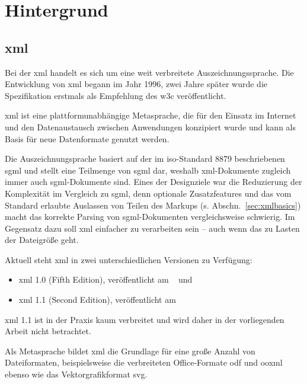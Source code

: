 \chapter{Hintergrund}
\label{chap:background}

\section{\acrfull{xml}}
\label{sec:xml}

Bei der \acrfull{xml} handelt es sich um eine weit verbreitete Auszeichnungssprache. Die Entwicklung von \acrshort{xml} begann im Jahr 1996, zwei Jahre später wurde die Spezifikation erstmals als Empfehlung des \acrfull{w3c} veröffentlicht.

\acrshort{xml} ist eine plattformunabhängige Metasprache, die für den Einsatz im Internet und den Datenaustausch zwischen Anwendungen konzipiert wurde und kann als Basis für neue Datenformate genutzt werden.

Die Auszeichnungsprache basiert auf der im \acrshort{iso}-Standard 8879 beschriebenen \acrfull{sgml} und stellt eine Teilmenge von \acrshort{sgml} dar, weshalb \acrshort{xml}-Dokumente zugleich immer auch \acrshort{sgml}-Dokumente sind. Eines der Designziele war die Reduzierung der Komplexität im Vergleich zu \acrshort{sgml}, denn optionale Zusatzfeatures und das vom Standard erlaubte Auslassen von Teilen des Markups (s. Abschn.~\ref{sec:xmlbasics}) macht das korrekte Parsing von \acrshort{sgml}-Dokumenten vergleichsweise schwierig. Im Gegensatz dazu soll \acrshort{xml} einfacher zu verarbeiten sein -- auch wenn das zu Lasten der Dateigröße geht.~\cite[Abschnitt 1.1]{xml,bray1998axml}

Aktuell steht \acrshort{xml} in zwei unterschiedlichen Versionen zu Verfügung:
\begin{itemize}
    \item{} \acrshort{xml} 1.0 (Fifth Edition), veröffentlicht am ~\cite{xml} und
    \item{} \acrshort{xml} 1.1 (Second Edition), veröffentlicht am ~\cite{xml11}
\end{itemize}

\acrshort{xml} 1.1 ist in der Praxis kaum verbreitet und wird daher in der vorliegenden Arbeit nicht betrachtet.

Als Metasprache bildet \acrshort{xml} die Grundlage für eine große Anzahl von Dateiformaten, beispielsweise die verbreiteten Office-Formate \gls{odf} und \gls{ooxml} ebenso wie das Vektorgrafikformat \gls{svg}.

